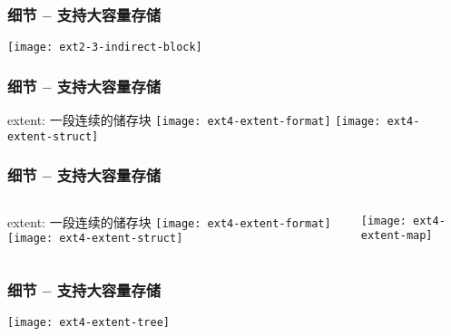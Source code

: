 \begin{frame}[fragile]
	\frametitle{细节 -- 支持大容量存储}
	\centering
    \texttt{[image: ext2-3-indirect-block]}
	
\end{frame}

\begin{frame}[fragile]
	\frametitle{细节 -- 支持大容量存储}
		\Large
	extent: 一段连续的储存块
\centering
	\texttt{[image: ext4-extent-format]}
	\texttt{[image: ext4-extent-struct]}
\end{frame}


\begin{frame}[fragile]
	\frametitle{细节 -- 支持大容量存储}
	\begin{columns}
	\begin{column}{.4\textwidth}
		
	extent: 一段连续的储存块
\centering
\texttt{[image: ext4-extent-format]}
\texttt{[image: ext4-extent-struct]}
		
	\end{column}
	
		\begin{column}{.6\textwidth}			

	\texttt{[image: ext4-extent-map]}

	
\end{column}
\end{columns}

\end{frame}


\begin{frame}[fragile]
	\frametitle{细节 -- 支持大容量存储}
	\centering
	\texttt{[image: ext4-extent-tree]}

\end{frame}




